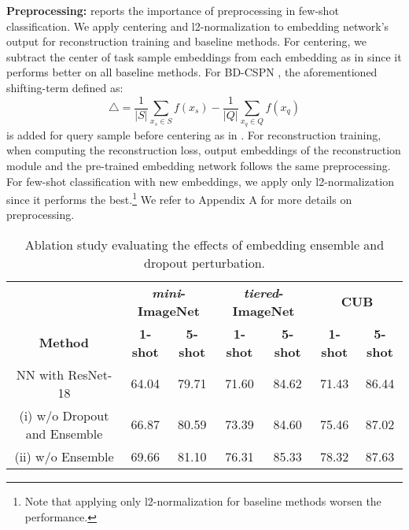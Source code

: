 \documentclass{article}
\begin{document}
\textbf{Preprocessing:}
\citet{SimpleShot} reports the importance of preprocessing in few-shot classification. We apply centering and l2-normalization to embedding network's output for reconstruction training and baseline methods. For centering, we subtract the center of task sample embeddings from each embedding as in \citet{TAFSSL} since it performs better on all baseline methods. For BD-CSPN \cite{BDCSPN}, the aforementioned shifting-term defined as:
\begin{equation}
	\label{equation:shift}
	\triangle=\frac{1}{|S|}\sum_{x_s\in S}f(x_s) - \frac{1}{|Q|}\sum_{x_q\in Q}f(x_q)
\end{equation}
is added for query sample before centering as in \citet{LaplacianShot, BDCSPN}. For reconstruction training, when computing the reconstruction loss, output embeddings of the reconstruction module and the pre-trained embedding network follows the same preprocessing. For few-shot classification with new embeddings, we apply only l2-normalization since it performs the best.\footnote{Note that applying only l2-normalization for baseline methods worsen the performance.} We refer to Appendix A for more details on preprocessing. \begin{table*}[t]
	\caption{Ablation study evaluating the effects of embedding ensemble and dropout perturbation.}
	\label{table:ablation}
	\begin{small}
		\begin{center}
			\begin{tabular}{c|cc|cc|cc}
				\hline
				& \multicolumn{2}{c|}{\textbf{\textit{mini}-ImageNet}} & \multicolumn{2}{c|}{\textbf{\textit{tiered}-ImageNet}} & \multicolumn{2}{c|}{\textbf{CUB}}          \\
				\textbf{Method}                                         & \textbf{1-shot}      & \textbf{5-shot}      & \textbf{1-shot}       & \textbf{5-shot}       & \textbf{1-shot} & \textbf{5-shot} \\ \hline
				NN with ResNet-18                                     & 64.04                & 79.71                & 71.60                 & 84.62                 & 71.43           & 86.44           \\ \hline
				(i) w/o Dropout and Ensemble                        & 66.87                & 80.59                & 73.39                 & 84.60                 & 75.46           & 87.02           \\
				(ii) w/o Ensemble                                       & 69.66                & 81.10                & 76.31                 & 85.33                 & 78.32           & 87.63           \\

\end{tabular}
\end{center}
\end{small}
\end{table*}
\end{document}
